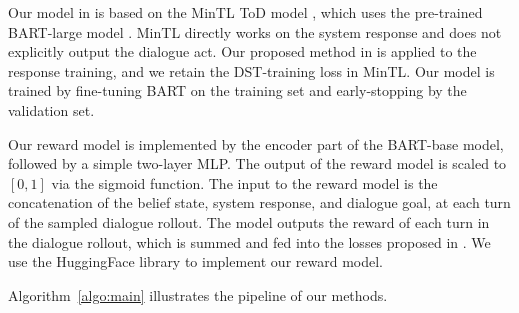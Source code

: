 Our model in  is based on the MinTL ToD model \citep{mintl2020}, which uses the pre-trained BART-large model \citep{bart2019}.
MinTL directly works on the system response and does not explicitly output the dialogue act.
Our proposed method in  is applied to the response training, and we retain the DST-training loss in MinTL.
Our model is trained by fine-tuning BART on the training set and early-stopping by the validation set.


Our reward model is implemented by the encoder part of the BART-base model, followed by a simple two-layer MLP.
The output of the reward model is scaled to $[0,1]$ via the sigmoid function.
The input to the reward model is the concatenation of the belief state, system response, and dialogue goal, at each turn of the sampled dialogue rollout.
The model outputs the reward of each turn in the dialogue rollout, which is summed and fed into the losses proposed in .
We use the HuggingFace library \citep{huggingface2019} to implement our reward model. 

Algorithm~\ref{algo:main} illustrates the pipeline of our methods.


